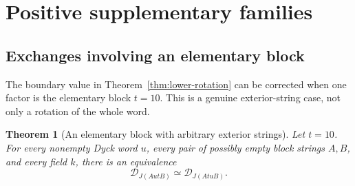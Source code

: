 \documentclass[11pt]{article}
\newtheorem{theorem}{Theorem}[section]
\theoremstyle{definition}
\begin{document}
\section{Positive supplementary families}
\label{sec:positive}
\subsection{Exchanges involving an elementary block}
The boundary value in Theorem~\ref{thm:lower-rotation} can be corrected when one factor
is the elementary block $t=10$. This is a genuine exterior-string
case, not only a rotation of the whole word.

\begin{theorem}[An elementary block with arbitrary exterior strings]
\label{thm:elementary-context}
Let $t=10$. For every nonempty Dyck word $u$, every pair of possibly
empty block strings $A,B$, and every field $k$, there is an equivalence
\[
 \mathcal D_{J(AutB)}\simeq\mathcal D_{J(AtuB)}.
\]
\end{theorem}
\end{document}
